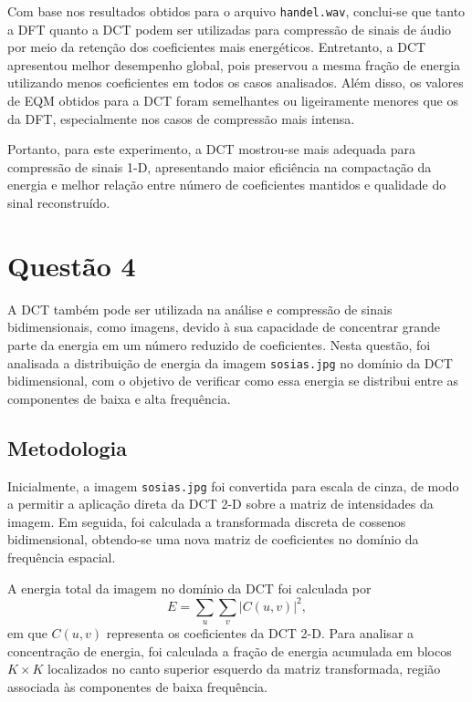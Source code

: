 \documentclass[12pt,a4paper]{article}
\begin{document}
Com base nos resultados obtidos para o arquivo \texttt{handel.wav}, conclui-se que tanto a DFT quanto a DCT podem ser utilizadas para compressão de sinais de áudio por meio da retenção dos coeficientes mais energéticos. Entretanto, a DCT apresentou melhor desempenho global, pois preservou a mesma fração de energia utilizando menos coeficientes em todos os casos analisados. Além disso, os valores de EQM obtidos para a DCT foram semelhantes ou ligeiramente menores que os da DFT, especialmente nos casos de compressão mais intensa.

Portanto, para este experimento, a DCT mostrou-se mais adequada para compressão de sinais 1-D, apresentando maior eficiência na compactação da energia e melhor relação entre número de coeficientes mantidos e qualidade do sinal reconstruído.



\section{Questão 4}

A DCT também pode ser utilizada na análise e compressão de sinais bidimensionais, como imagens, devido à sua capacidade de concentrar grande parte da energia em um número reduzido de coeficientes. Nesta questão, foi analisada a distribuição de energia da imagem \texttt{sosias.jpg} no domínio da DCT bidimensional, com o objetivo de verificar como essa energia se distribui entre as componentes de baixa e alta frequência.

\subsection{Metodologia}

Inicialmente, a imagem \texttt{sosias.jpg} foi convertida para escala de cinza, de modo a permitir a aplicação direta da DCT 2-D sobre a matriz de intensidades da imagem. Em seguida, foi calculada a transformada discreta de cossenos bidimensional, obtendo-se uma nova matriz de coeficientes no domínio da frequência espacial.

A energia total da imagem no domínio da DCT foi calculada por
\[
E=\sum_u\sum_v |C(u,v)|^2,
\]
em que \(C(u,v)\) representa os coeficientes da DCT 2-D. Para analisar a concentração de energia, foi calculada a fração de energia acumulada em blocos \(K \times K\) localizados no canto superior esquerdo da matriz transformada, região associada às componentes de baixa frequência.
\end{document}
